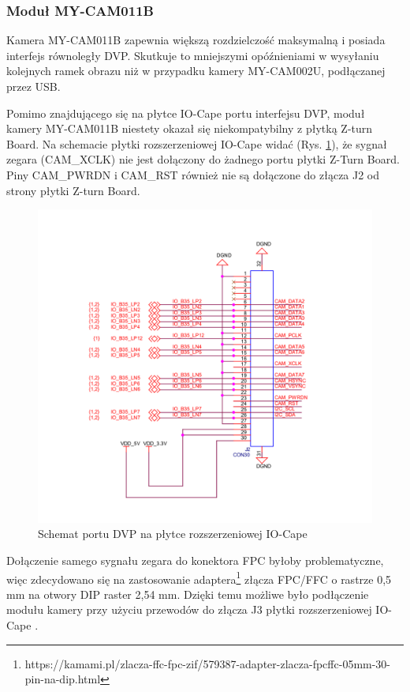 \subsubsection{Moduł MY-CAM011B}

Kamera MY-CAM011B zapewnia większą rozdzielczość maksymalną i posiada interfejs równoległy DVP. Skutkuje to mniejszymi opóźnieniami w wysyłaniu kolejnych ramek obrazu niż w przypadku kamery MY-CAM002U, podłączanej przez USB. 

Pomimo znajdującego się na płytce IO-Cape portu interfejsu DVP, moduł kamery MY-CAM011B niestety okazał się niekompatybilny z płytką Z-turn Board. Na schemacie płytki rozszerzeniowej IO-Cape widać (Rys. \ref{cam-schematic}), że sygnał zegara (CAM\_XCLK) nie jest dołączony do żadnego portu płytki Z-Turn Board. Piny CAM\_PWRDN i CAM\_RST również nie są dołączone do złącza J2 od strony płytki Z-turn Board. 

\begin{figure}[!h]
  \centering
  \includegraphics[width=\textwidth]{img/cam-schematic.png}
  \caption{Schemat portu DVP na płytce rozszerzeniowej IO-Cape}
  \label{cam-schematic}
\end{figure}

Dołączenie samego sygnału zegara do konektora FPC byłoby problematyczne, więc zdecydowano się na zastosowanie adaptera\footnote{https://kamami.pl/zlacza-ffc-fpc-zif/579387-adapter-zlacza-fpcffc-05mm-30-pin-na-dip.html} złącza FPC/FFC o rastrze 0,5 mm na otwory DIP raster 2,54 mm. Dzięki temu możliwe było podłączenie modułu kamery przy użyciu przewodów do złącza J3 płytki rozszerzeniowej IO-Cape \cite{ZturnIOCapeSchematic}.


